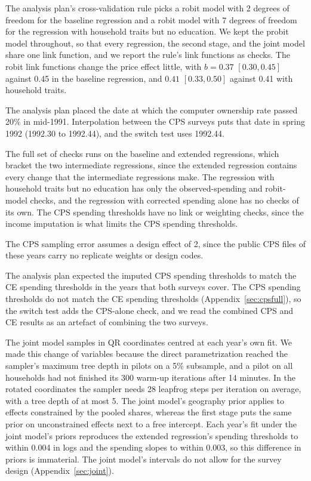 \documentclass[11pt]{article}
\begin{document}
The analysis plan's cross-validation rule picks a robit model with 2 degrees of freedom for the baseline regression and a robit model with 7 degrees of freedom for the regression with household traits but no education. We kept the probit model throughout, so that every regression, the second stage, and the joint model share one link function, and we report the rule's link functions as checks. The robit link functions change the price effect little, with $b = 0.37$ $[0.30, 0.45]$ against 0.45 in the baseline regression, and $0.41$ $[0.33, 0.50]$ against 0.41 with household traits.

The analysis plan placed the date at which the computer ownership rate passed 20\% in mid-1991. Interpolation between the CPS surveys puts that date in spring 1992 (1992.30 to 1992.44), and the switch test uses 1992.44.

The full set of checks runs on the baseline and extended regressions, which bracket the two intermediate regressions, since the extended regression contains every change that the intermediate regressions make. The regression with household traits but no education has only the observed-spending and robit-model checks, and the regression with corrected spending alone has no checks of its own. The CPS spending thresholds have no link or weighting checks, since the income imputation is what limits the CPS spending thresholds.

The CPS sampling error assumes a design effect of 2, since the public CPS files of these years carry no replicate weights or design codes.

The analysis plan expected the imputed CPS spending thresholds to match the CE spending thresholds in the years that both surveys cover. The CPS spending thresholds do not match the CE spending thresholds (Appendix~\ref{sec:cpsfull}), so the switch test adds the CPS-alone check, and we read the combined CPS and CE results as an artefact of combining the two surveys.

The joint model samples in QR coordinates centred at each year's own fit. We made this change of variables because the direct parametrization reached the sampler's maximum tree depth in pilots on a 5\% subsample, and a pilot on all households had not finished its 300 warm-up iterations after 14 minutes. In the rotated coordinates the sampler needs 28 leapfrog steps per iteration on average, with a tree depth of at most 5. The joint model's geography prior applies to effects constrained by the pooled shares, whereas the first stage puts the same prior on unconstrained effects next to a free intercept. Each year's fit under the joint model's priors reproduces the extended regression's spending thresholds to within 0.004 in logs and the spending slopes to within 0.003, so this difference in priors is immaterial. The joint model's intervals do not allow for the survey design (Appendix~\ref{sec:joint}).
\end{document}
